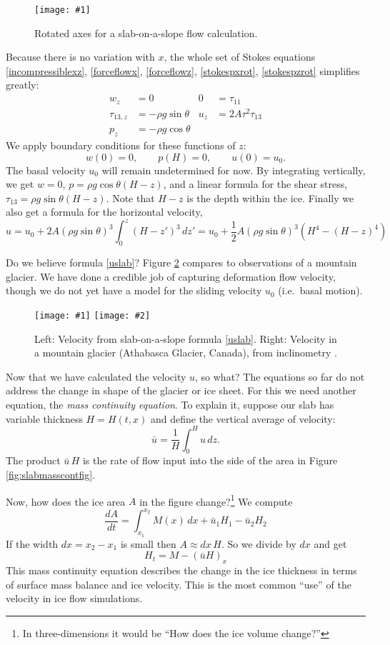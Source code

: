 \documentclass[titlepage,letterpaper,final,12pt]{scrartcl}
\newcommand{\onefigsize}[3]{
\begin{figure}[ht]
\centering
\texttt{[image: \#1]}
\caption{#2}
\label{fig:#1}
\end{figure}}
\newcommand{\onefig}[2]{\onefigsize{#1}{#2}{3.0in}}
\newcommand{\twofigsizes}[5]{
\begin{figure}[ht]
\centering
\texttt{[image: \#1]} \quad
\texttt{[image: \#2]}
\caption{#3}
\label{fig:#1}
\end{figure}}
\begin{document}
\onefig{slab}{Rotated axes for a slab-on-a-slope flow calculation.}

Because there is no variation with $x$, the whole set of Stokes equations \eqref{incompressiblexz}, \eqref{forceflowx}, \eqref{forceflowz}, \eqref{stokespxrot}, \eqref{stokespzrot} simplifies greatly:
\begin{align*}
w_z &= 0 &   0 &= \tau_{11} \\
\tau_{13,z} &= - \rho g \sin\theta &   u_z &= 2 A \tau^2 \tau_{13} \\
p_z &= - \rho g \cos\theta
\end{align*}
We apply boundary conditions for these functions of $z$:
	$$w(0)=0, \qquad p(H)=0, \qquad u(0)=u_0.$$
The basal velocity $u_0$ will remain undetermined for now.  By integrating vertically, we get $w=0$, $p = \rho g \cos\theta (H-z)$, and a linear formula for the shear stress, $\tau_{13} = \rho g \sin\theta (H-z)$.  Note that $H-z$ is the depth within the ice.  Finally we also get a formula for the horizontal velocity,
\begin{equation}
u = u_0 + 2 A (\rho g \sin\theta)^3 \int_0^z (H-z')^3\,dz' = u_0 + \frac{1}{2} A (\rho g \sin\theta)^3  \left(H^4 - (H-z)^4\right) \label{uslab}
\end{equation}

Do we believe formula \eqref{uslab}?  Figure \ref{fig:slabvel} compares to observations of a mountain glacier.  We have done a credible job of capturing deformation flow velocity, though we do not yet have a model for the sliding velocity $u_0$ (i.e.~basal motion).  

\twofigsizes{slabvel}{athabasca_deform}{Left:  Velocity from slab-on-a-slope formula \eqref{uslab}.  Right:  Velocity in a mountain glacier (Athabasca Glacier, Canada), from inclinometry \cite{SavagePaterson}.}{2.2in}{2.0in}

Now that we have calculated the velocity $u$, so what?  The equations so far do not address the change in shape of the glacier or ice sheet.  For this we need another equation, the \emph{mass continuity equation}.  To explain it, suppose our slab has variable thickness $H=H(t,x)$ and define the vertical average of velocity:
	$$\bar u = \frac{1}{H}\int_0^{H} u\,dz.$$
The product $\bar u\, H$ is the rate of flow input into the side of the area in Figure \ref{fig:slabmasscontfig}.

Now, how does the ice area $A$ in the figure change?\footnote{In three-dimensions it would be ``How does the ice volume change?''}  We compute
	$$\frac{dA}{dt} = \int_{x_1}^{x_2} M(x)\,dx + \bar u_1 H_1 - \bar u_2 H_2$$
If the width $dx=x_2-x_1$ is small then $A\approx dx\, H$.  So we divide by $dx$ and get
\begin{equation}
H_t = M - \left(\bar u H\right)_x \label{masscont1D}
\end{equation}
This mass continuity equation describes the change in the ice thickness in terms of surface mass balance and ice velocity.  This is the most common ``use'' of the velocity in ice flow simulations.
\end{document}
